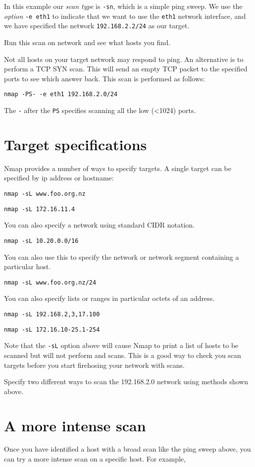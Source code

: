 \documentclass{article}
\begin{document}
In this example our \emph{scan type} is \texttt{-sn}, which is a simple ping sweep.  We use the \emph{option} \texttt{-e eth1} to indicate that we want to use the \texttt{eth1} network interface, and we have specified the network \texttt{192.168.2.2/24} as our target.

Run this scan on network and see what hosts you find.  

Not all hosts on your target network may respond to ping. An alternative is to perform a TCP SYN scan. This will send an empty TCP packet to the specified ports to see which answer back. This scan is performed as follows:

\texttt{nmap -PS- -e eth1 192.168.2.0/24}

The \texttt{-} after the \texttt{PS} specifies scanning all the low (<1024) ports.


\section{Target specifications}
Nmap provides a number of ways to specify targets.  A single target can be specified by ip address or hostname:

\texttt{nmap -sL www.foo.org.nz}

\texttt{nmap -sL 172.16.11.4}

You can also specify a network using standard CIDR notation.

\texttt{nmap -sL 10.20.0.0/16}

You can also use this to specify the network or network segment containing a particular host.

\texttt{nmap -sL www.foo.org.nz/24}

You can also specify lists or ranges in particular octets of an address.

\texttt{nmap -sL 192.168.2,3,17.100}

\texttt{nmap -sL 172.16.10-25.1-254}

Note that the \texttt{-sL} option above will cause Nmap to print a list of hosts to be scanned but will not perform and scans. This is a good way to check you scan targets before you start firehosing your network with scans.

Specify two different ways to scan the 192.168.2.0 network using methods shown above.


\section{A more intense scan}
Once you have identified a host with a broad scan like the ping sweep above, you can try a more intense scan on a specific host. For example, 
\end{document}
